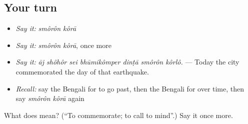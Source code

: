 \subsection*{Your turn}
\begin{itemize}
\raggedright
  \item \emph{Say it:} \emph{smôrôn kôrā}
  \item \emph{Say it:} \emph{smôrôn kôrā}, once more
  \item \emph{Say it:} \emph{āj shôhôr sei bhūmikômper dinṭā smôrôn kôrlô.} — Today the city commemorated the day of that earthquake.
  \item \emph{Recall:} say the Bengali for to go past, then the Bengali for over time, then say \emph{smôrôn kôrā} again
\end{itemize}

\begin{tcolorbox}[breakable,colback=teal!4,colframe=teal!35!black,title={Before you move on}]
What does   mean? (\textquotedblleft{}To commemorate; to call to mind\textquotedblright{}.) Say it once more.
\end{tcolorbox}
